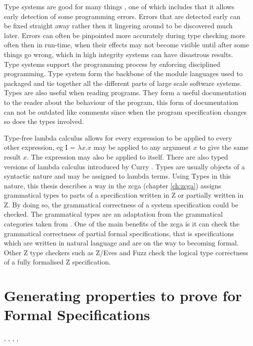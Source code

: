 Type systems are good for many things \cite{pierce}, one of which includes that it allows early detection of some programming errors. Errors that are detected early can be fixed straight away rather then it lingering around to be discovered much later. Errors can often be pinpointed more accurately during type checking more often then in run-time, when their effects may not become visible until after some things go wrong, which in high integrity systems can have disastrous results. Type systems support the programming process by enforcing disciplined programming. Type system form the backbone of the module languages used to packaged and tie together all the different parts of large scale software systems. Types are also useful when reading programs. They form a useful documentation to the reader about the behaviour of the program, this form of documentation can not be outdated like comments since when the program specification changes so does the types involved.

Type-free lambda calculus \cite{bar93} allows for every expression to be applied to every other expression, eg I = $\lambda x.x$ may be applied to any argument $x$ to give the same result $x$. The expression may also be applied to itself. There are also typed versions of lambda calculus introduced by Curry \cite{cu34}. Types are usually objects of a syntactic nature and may be assigned to lambda terms. Using Types in this nature, this thesis describes a way in the \gls{zcga} (chapter \ref{ch:zcga}) assigns grammatical types to parts of a specification written in Z or partially written in Z. By doing so, the grammatical correctness of a system specification could be checked. The grammatical types are an adaptation from the grammatical categories taken from \cite{wtt}. One of the main benefits of the \gls{zcga} is it can check the grammatical correctness of partial formal specifications, that is specifications which are written in natural language and are on the way to becoming formal. Other Z type checkers such as Z/Eves \cite{Saaltink99thez/eves} and Fuzz \cite{spiveyfuzz} check the logical type correctness of a fully formalised Z specification.

\section{Generating properties to prove for Formal Specifications}

\cite{DBLP:conf/icsea/WenMZ06}, \cite{DBLP:conf/sefm/FraserB07}, \cite{stepney1998tale}, \cite{Woodcock:1996:UZS:235337}, \cite{woodcock2004tutorial}

